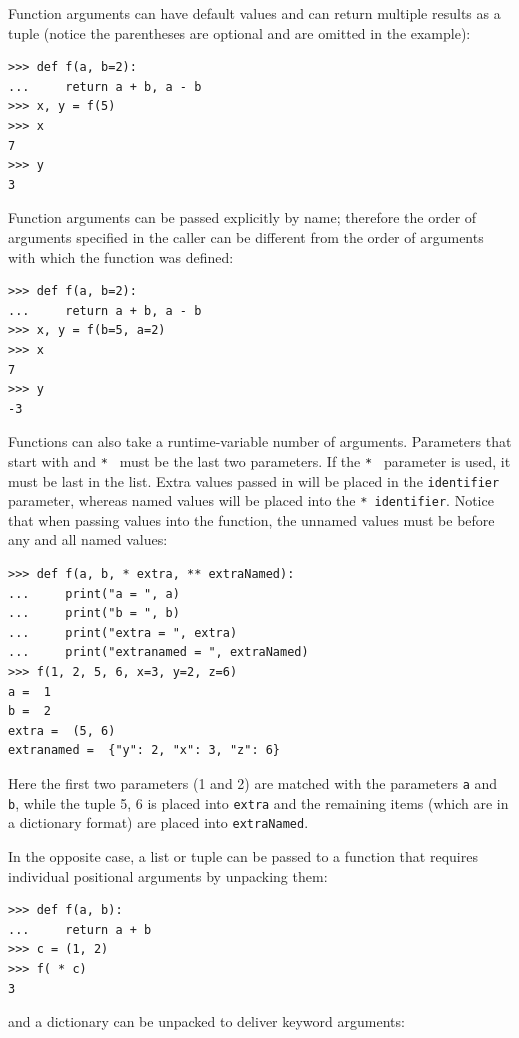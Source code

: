 \documentclass[justified, sixbynine]{tufte-book}
\def\ft{\small\tt}
\theoremstyle{plain}%
\newtheorem * {corollary}{Corollary}
\theoremstyle{definition}
\theoremstyle{remark}
\newtheorem * {remark}{Remark}
\newtheorem * {note}{Note}
\begin{document}
\begin{fullwidth}
Function arguments can have default values and can return multiple results as a tuple (notice the parentheses are optional and are omitted in the example):

\begin{lstlisting}
>>> def f(a, b=2):
...     return a + b, a - b
>>> x, y = f(5)
>>> x
7
>>> y
3
\end{lstlisting}

Function arguments can be passed explicitly by name; therefore the order of arguments specified in the caller can be different from the order of arguments with which the function was defined:

\begin{lstlisting}
>>> def f(a, b=2):
...     return a + b, a - b
>>> x, y = f(b=5, a=2)
>>> x
7
>>> y
-3
\end{lstlisting}

Functions can also take a runtime-variable number of arguments.  Parameters that start with {\ft * } and {\ft ** } must be the last two parameters.  If the {\ft ** } parameter is used, it must be last in the list.  Extra values passed in will be placed in the {\ft * identifier} parameter, whereas named values will be placed into the {\ft ** identifier}.  Notice that when passing values into the function, the unnamed values must be before any and all named values:

\begin{lstlisting}
>>> def f(a, b, * extra, ** extraNamed):
...     print("a = ", a)
...     print("b = ", b)
...     print("extra = ", extra)
...     print("extranamed = ", extraNamed)
>>> f(1, 2, 5, 6, x=3, y=2, z=6)
a =  1
b =  2
extra =  (5, 6)
extranamed =  {"y": 2, "x": 3, "z": 6}
\end{lstlisting}

Here the first two parameters (1 and 2) are matched with the parameters {\ft a} and {\ft b}, while the tuple 5, 6 is placed into {\ft extra} and the remaining items (which are in a dictionary format) are placed into {\ft extraNamed}.

In the opposite case, a list or tuple can be passed to a function that requires individual positional arguments by unpacking them:

\begin{lstlisting}
>>> def f(a, b):
...     return a + b
>>> c = (1, 2)
>>> f( * c)
3
\end{lstlisting}
\noindent and a dictionary can be unpacked to deliver keyword arguments:


\end{fullwidth}
\end{document}

